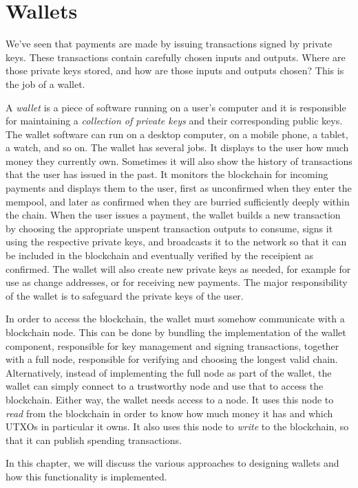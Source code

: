 \chapter{Wallets}

We've seen that payments are made by issuing transactions signed by private keys.
These transactions contain carefully chosen inputs and outputs. Where are those
private keys stored, and how are those inputs and outputs chosen? This is the job
of a wallet.

A \emph{wallet} is a piece of software running on a user's computer and it is
responsible for maintaining a \emph{collection of private keys} and their corresponding
public keys. The wallet software can run on a desktop computer, on a mobile phone,
a tablet, a watch, and so on.
The wallet has several jobs. It displays to the user how much money they
currently own. Sometimes it will also show the history of transactions that the user
has issued in the past. It monitors the blockchain for incoming payments and displays
them to the user, first as unconfirmed when they enter the mempool, and later as confirmed
when they are burried sufficiently deeply within the chain. When the user issues
a payment, the wallet builds a new transaction by choosing the appropriate unspent transaction
outputs to consume, signs it using the respective private keys, and broadcasts it to the
network so that it can be included in the blockchain and eventually verified by the receipient
as confirmed. The wallet will also create new private keys as needed, for example for
use as change addresses, or for receiving new payments. The major responsibility
of the wallet is to safeguard the private keys of the user.

In order to access the blockchain, the wallet must somehow communicate
with a blockchain node. This can be done by bundling the implementation of the
wallet component, responsible for key management and signing transactions, together
with a full node, responsible for verifying and choosing the longest valid chain.
Alternatively, instead of implementing the full node as part of the wallet, the
wallet can simply connect to a trustworthy node and use that to access the
blockchain. Either way, the wallet needs access to a node. It uses this node to
\emph{read} from the blockchain in order to know how much money it has and which UTXOs in
particular it owns. It also uses this node to \emph{write} to the blockchain,
so that it can publish spending transactions.

In this chapter, we will discuss the various approaches to designing wallets and how
this functionality is implemented.

